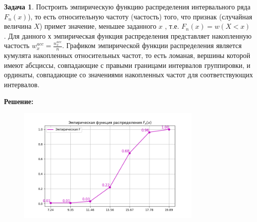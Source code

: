 \documentclass[a4paper,11pt]{article}
\theoremstyle{definition}
\newtheorem{problem}{Задача}\setlength{\parindent}{0pt}
\newenvironment{solution}
{\begin{shaded}\textbf{Решение:}\par\setlength{\parindent}{0pt}}
{\end{shaded}}
\newenvironment{answer}
{\par\noindent\textbf{Ответ:} }
{\par}
\begin{document}
\vspace{8pt}
\begin{problem}
    Построить эмпирическую функцию распределения интервального ряда \(F_n(x)\)), то
    есть относительную частоту (частость) того, что признак (случайная величина \(X\)) 
    примет значение, меньшее заданного \(x\) , т.е. \(F_n(x) = w(X < x)\) . 
    Для данного \(х\) эмпирическая функция распределения представляет 
    накопленную частость \(w^{acc}_x = \frac{n^{acc}_x}{n}\).
    Графиком эмпирической функции распределения является кумулята накопленных
    относительных частот, то есть ломаная, вершины которой имеют абсциссы,
    совпадающие с правыми границами интервалов группировки, и ординаты,
    совпадающие со значениями накопленных частот для соответствующих
    интервалов.
    
        \begin{solution}
            \begin{figure}[H]
                \centering
                \includegraphics[width=0.8\textwidth]{plots/1.1.5.png}\label{fig:figure}
            \end{figure}
        \end{solution}
    
    
    \end{problem}
\end{document}
